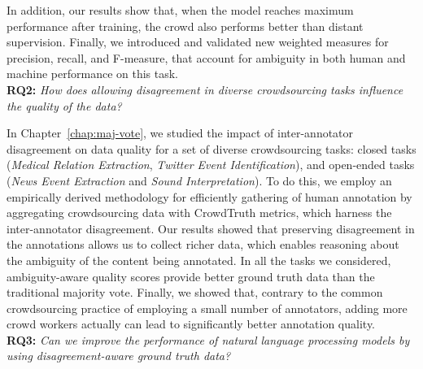 In addition, our results show that, when the model reaches maximum performance after training, the crowd also performs better than distant supervision. Finally, we introduced and validated new weighted measures for precision, recall, and F-measure, that account for ambiguity in both human and machine performance on this task. \\


\textbf{RQ2:} \textit{How does allowing disagreement in diverse crowdsourcing tasks influence the quality of the data?}

In Chapter~\ref{chap:maj-vote}, we studied the impact of inter-annotator disagreement on data quality for a set of diverse crowdsourcing tasks: closed tasks (\textit{Medical Relation Extraction}, \textit{Twitter Event Identification}), and open-ended tasks (\textit{News Event Extraction} and \textit{Sound Interpretation}). To do this, we employ an empirically derived methodology for efficiently gathering of human annotation by aggregating crowdsourcing data with CrowdTruth metrics, which harness the inter-annotator disagreement. Our results showed that preserving disagreement in the annotations allows us to collect richer data, which enables reasoning about the ambiguity of the content being annotated. In all the tasks we considered, ambiguity-aware quality scores provide better ground truth data than the traditional majority vote. Finally, we showed that, contrary to the common crowdsourcing practice of employing a small number of annotators, adding more crowd workers actually can lead to significantly better annotation quality. \\



\textbf{RQ3:} \textit{Can we improve the performance of natural language processing models by using disagreement-aware ground truth data?}

